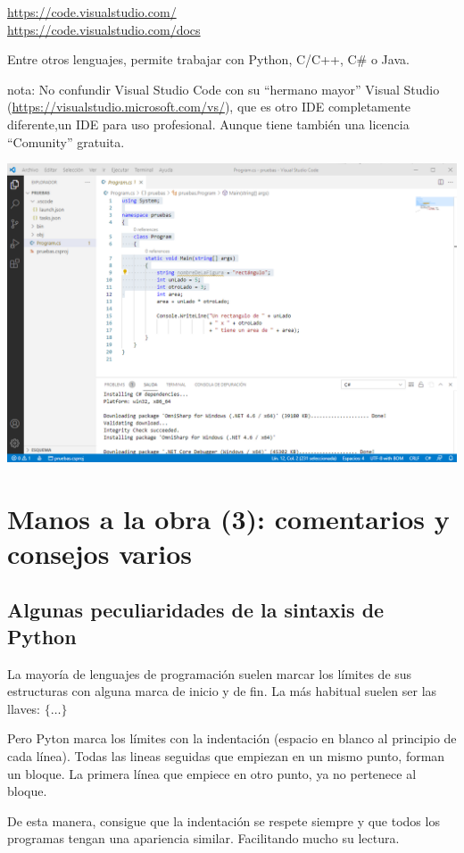 \documentclass[spanish,12pt,a4paper,final,oneside]{book}
\begin{document}
\url{https://code.visualstudio.com/}
\\ \url{https://code.visualstudio.com/docs}

Entre otros lenguajes, permite trabajar con Python, C/C++, C\# o Java.

nota: No confundir Visual Studio Code con su ``hermano mayor'' Visual Studio (\url{https://visualstudio.microsoft.com/vs/}), que es otro IDE completamente diferente,un IDE para uso profesional. Aunque tiene también una licencia ``Comunity'' gratuita.

\includegraphics[width=\textwidth]{pantallazo de VSCode.png}


\section{Manos a la obra (3): comentarios y consejos varios}\label{manos_a_la_obra_3}

\subsection{Algunas peculiaridades de la sintaxis de Python}

La mayoría de lenguajes de programación suelen marcar los límites de sus estructuras con alguna marca de inicio y de fin. La más habitual suelen ser las llaves:  $\{ \ldots \}$

Pero Pyton marca los límites con la indentación (espacio en blanco al principio de cada línea). Todas las lineas seguidas que empiezan en un mismo punto, forman un bloque. La primera línea que empiece en otro punto, ya no pertenece al bloque.

De esta manera, consigue que la indentación se respete siempre y que todos los programas tengan una apariencia similar. Facilitando mucho su lectura.
\end{document}
